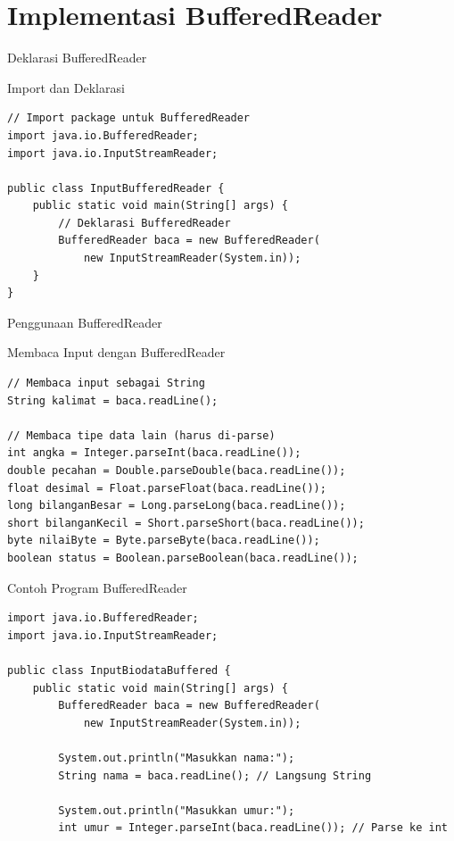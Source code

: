 \documentclass{beamer}
\begin{document}
\section{Implementasi BufferedReader}
\begin{frame}[fragile]{Deklarasi BufferedReader}
  \begin{block}{Import dan Deklarasi}
    \begin{lstlisting}
// Import package untuk BufferedReader
import java.io.BufferedReader;
import java.io.InputStreamReader;

public class InputBufferedReader {
    public static void main(String[] args) {
        // Deklarasi BufferedReader
        BufferedReader baca = new BufferedReader(
            new InputStreamReader(System.in));
    }
}
    \end{lstlisting}
  \end{block}
\end{frame}

\begin{frame}[fragile]{Penggunaan BufferedReader}
  \begin{block}{Membaca Input dengan BufferedReader}
    \begin{lstlisting}
// Membaca input sebagai String
String kalimat = baca.readLine();

// Membaca tipe data lain (harus di-parse)
int angka = Integer.parseInt(baca.readLine());
double pecahan = Double.parseDouble(baca.readLine());
float desimal = Float.parseFloat(baca.readLine());
long bilanganBesar = Long.parseLong(baca.readLine());
short bilanganKecil = Short.parseShort(baca.readLine());
byte nilaiByte = Byte.parseByte(baca.readLine());
boolean status = Boolean.parseBoolean(baca.readLine());
    \end{lstlisting}
  \end{block}
\end{frame}

\begin{frame}[fragile]{Contoh Program BufferedReader}
\begin{lstlisting}
import java.io.BufferedReader;
import java.io.InputStreamReader;

public class InputBiodataBuffered {
    public static void main(String[] args) {
        BufferedReader baca = new BufferedReader(
            new InputStreamReader(System.in));
        
        System.out.println("Masukkan nama:");
        String nama = baca.readLine(); // Langsung String
        
        System.out.println("Masukkan umur:");
        int umur = Integer.parseInt(baca.readLine()); // Parse ke int
\end{lstlisting}
\end{frame}
\end{document}
